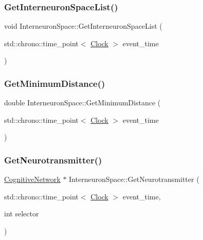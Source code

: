 \mbox{\label{classInterneuronSpace_ae77729a0c140cfb8a9121e898be791b2}} 
\subsubsection{\texorpdfstring{Get\+Interneuron\+Space\+List()}{GetInterneuronSpaceList()}}
{\footnotesize\ttfamily void Interneuron\+Space\+::\+Get\+Interneuron\+Space\+List (\begin{DoxyParamCaption}\item[{std\+::chrono\+::time\+\_\+point$<$ \mbox{\hyperlink{universe_8h_a0ef8d951d1ca5ab3cfaf7ab4c7a6fd80}{Clock}} $>$}]{event\+\_\+time }\end{DoxyParamCaption})}

\mbox{\label{classInterneuronSpace_a243535a8f09f104c3a4488f6df4cfd57}} 
\subsubsection{\texorpdfstring{Get\+Minimum\+Distance()}{GetMinimumDistance()}}
{\footnotesize\ttfamily double Interneuron\+Space\+::\+Get\+Minimum\+Distance (\begin{DoxyParamCaption}\item[{std\+::chrono\+::time\+\_\+point$<$ \mbox{\hyperlink{universe_8h_a0ef8d951d1ca5ab3cfaf7ab4c7a6fd80}{Clock}} $>$}]{event\+\_\+time }\end{DoxyParamCaption})}

\mbox{\label{classInterneuronSpace_a7a60c95c8706cbff3084e74b7b15d75c}} 
\subsubsection{\texorpdfstring{Get\+Neurotransmitter()}{GetNeurotransmitter()}}
{\footnotesize\ttfamily \mbox{\hyperlink{classCognitiveNetwork}{Cognitive\+Network}} $\ast$ Interneuron\+Space\+::\+Get\+Neurotransmitter (\begin{DoxyParamCaption}\item[{std\+::chrono\+::time\+\_\+point$<$ \mbox{\hyperlink{universe_8h_a0ef8d951d1ca5ab3cfaf7ab4c7a6fd80}{Clock}} $>$}]{event\+\_\+time,  }\item[{int}]{selector }\end{DoxyParamCaption})}

